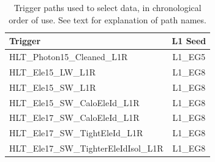 \begin{table}[htbp]
  \begin{center}
    \caption[Trigger paths used to select data]
    {\fixspacing Trigger paths used to select data, 
    in chronological order of use. 
    See text for explanation of path names.  
    }
    \label{TableTriggerPaths}
    \begin{tabular}[]{ | l | c | }
      \hline
      Trigger & L1 Seed \\ \hline \hline
      HLT\_Photon15\_Cleaned\_L1R & L1\_EG5 \\ \hline
      HLT\_Ele15\_LW\_L1R & L1\_EG8 \\ \hline
      HLT\_Ele15\_SW\_L1R & L1\_EG8 \\ \hline
      HLT\_Ele15\_SW\_CaloEleId\_L1R & L1\_EG8 \\ \hline
      HLT\_Ele17\_SW\_CaloEleId\_L1R & L1\_EG8 \\ \hline
      HLT\_Ele17\_SW\_TightEleId\_L1R & L1\_EG8 \\ \hline
      HLT\_Ele17\_SW\_TighterEleIdIsol\_L1R & L1\_EG8 \\ \hline
    \end{tabular}
  \end{center}
\end{table}

